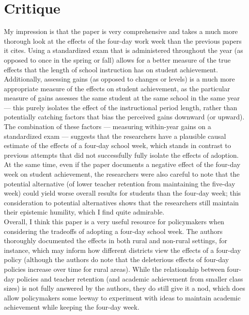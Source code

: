 \documentclass[8pt]{extarticle}
\begin{document}
  \section{Critique}%
  My impression is that the paper is very comprehensive and takes a much more thorough look at the effects of the four-day work week than the previous papers it cites. Using a standardized exam that is administered throughout the year (as opposed to once in the spring or fall) allows for a better measure of the true effects that the length of school instruction has on student achievement. Additionally, assessing gains (as opposed to changes or levels) is a much more appropriate measure of the effects on student achievement, as the particular measure of gains assesses the same student at the same school in the same year --- this purely isolates the effect of the instructional period length, rather than potentially catching factors that bias the perceived gains downward (or upward). The combination of these factors --- measuring within-year gains on a standardized exam --- suggests that the researchers have a plausible causal estimate of the effects of a four-day school week, which stands in contrast to previous attempts that did not successfully fully isolate the effects of adoption. At the same time, even if the paper documents a negative effect of the four-day week on student achievement, the researchers were also careful to note that the potential alternative (of lower teacher retention from maintaining the five-day week) could yield worse overall results for students than the four-day week; this consideration to potential alternatives shows that the researchers still maintain their epistemic humility, which I find quite admirable.\\

  Overall, I think this paper is a very useful resource for policymakers when considering the tradeoffs of adopting a four-day school week. The authors thoroughly documented the effects in both rural and non-rural settings, for instance, which may inform how different districts view the effects of a four-day policy (although the authors do note that the deleterious effects of four-day policies increase over time for rural areas). While the relationship between four-day policies and teacher retention (and academic achievement from smaller class sizes) is not fully answered by the authors, they do still give it a nod, which does allow policymakers some leeway to experiment with ideas to maintain academic achievement while keeping the four-day week.\\
\end{document}
